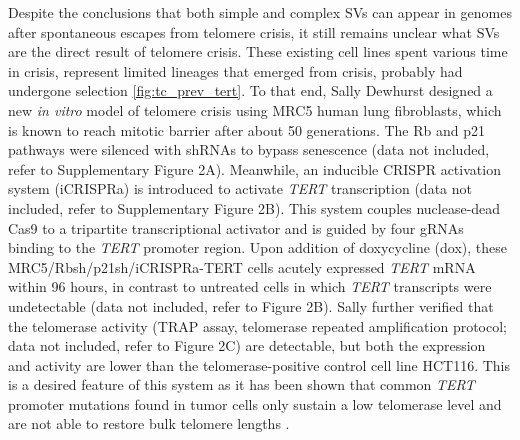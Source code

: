 \documentclass[phd,tocprelim]{cornell}
\begin{document}
Despite the conclusions that both simple and complex SVs can appear in genomes after spontaneous escapes from telomere crisis, it still remains unclear what SVs are the direct result of telomere crisis. These existing cell lines spent various time in crisis, represent limited lineages that emerged from crisis, probably had undergone selection \ref{fig:tc_prev_tert}. To that end, Sally Dewhurst designed a new \textit{in vitro} model of telomere crisis using MRC5 human lung fibroblasts, which is known to reach mitotic barrier after about 50 generations. The Rb and p21 pathways were silenced with shRNAs to bypass senescence (data not included, refer to \cite{Dewhurst2021-jk} Supplementary Figure 2A). Meanwhile, an inducible CRISPR activation system (iCRISPRa) is introduced to activate \textit{TERT} transcription (data not included, refer to \cite{Dewhurst2021-jk} Supplementary Figure 2B). This system couples nuclease-dead Cas9 to a tripartite transcriptional activator and is guided by four gRNAs binding to the \textit{TERT} promoter region. Upon addition of doxycycline (dox), these MRC5/Rbsh/p21sh/iCRISPRa-TERT cells acutely expressed \textit{TERT} mRNA within 96 hours, in contrast to untreated cells in which \textit{TERT} transcripts were undetectable (data not included, refer to \cite{Dewhurst2021-jk} Figure 2B). Sally further verified that the telomerase activity (TRAP assay, telomerase repeated amplification protocol; data not included, refer to \cite{Dewhurst2021-jk} Figure 2C) are detectable, but both the expression and activity are lower than the telomerase-positive control cell line HCT116. This is a desired feature of this system as it has been shown that common \textit{TERT} promoter mutations found in tumor cells only sustain a low telomerase level and are not able to restore bulk telomere lengths \cite{Chiba2017-gq}.
\end{document}
